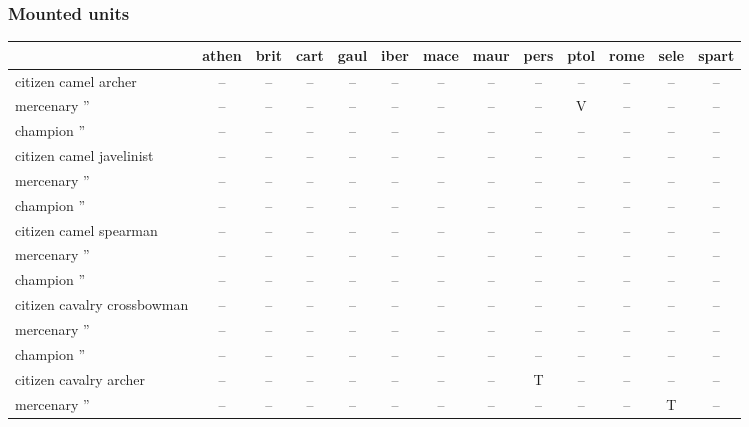 \documentclass{article}
\begin{document}
\subsubsection{Mounted units}
\begin{tabular}{l|cccc|cccc|cccc}
 & athen & brit & cart & gaul & iber & mace & maur & pers & ptol & rome & sele & spart \\
\hline
citizen camel archer                  & -- & -- & -- & -- & -- & -- & -- & -- & -- & -- & -- & -- \\
mercenary ''                          & -- & -- & -- & -- & -- & -- & -- & -- & V  & -- & -- & -- \\
champion  ''                          & -- & -- & -- & -- & -- & -- & -- & -- & -- & -- & -- & -- \\
\hline
citizen camel javelinist              & -- & -- & -- & -- & -- & -- & -- & -- & -- & -- & -- & -- \\
mercenary ''                          & -- & -- & -- & -- & -- & -- & -- & -- & -- & -- & -- & -- \\
champion  ''                          & -- & -- & -- & -- & -- & -- & -- & -- & -- & -- & -- & -- \\
\hline
citizen camel spearman                & -- & -- & -- & -- & -- & -- & -- & -- & -- & -- & -- & -- \\
mercenary ''                          & -- & -- & -- & -- & -- & -- & -- & -- & -- & -- & -- & -- \\
champion  ''                          & -- & -- & -- & -- & -- & -- & -- & -- & -- & -- & -- & -- \\
\hline
citizen cavalry crossbowman           & -- & -- & -- & -- & -- & -- & -- & -- & -- & -- & -- & -- \\
mercenary ''                          & -- & -- & -- & -- & -- & -- & -- & -- & -- & -- & -- & -- \\
champion  ''                          & -- & -- & -- & -- & -- & -- & -- & -- & -- & -- & -- & -- \\
\hline
citizen cavalry archer                & -- & -- & -- & -- & -- & -- & -- & T  & -- & -- & -- & -- \\
mercenary ''                          & -- & -- & -- & -- & -- & -- & -- & -- & -- & -- & T  & -- \\

\end{tabular}
\end{document}
